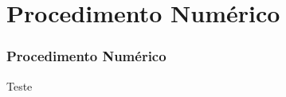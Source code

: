 \documentclass[../main/main.tex]{subfiles}
\begin{document}
    \section{Procedimento Numérico}
    
    
    \begin{frame}
        \frametitle{Procedimento Numérico}
    \end{frame}
    
    \begin{frame}
        Teste
    \end{frame}
    
    
\end{document}
